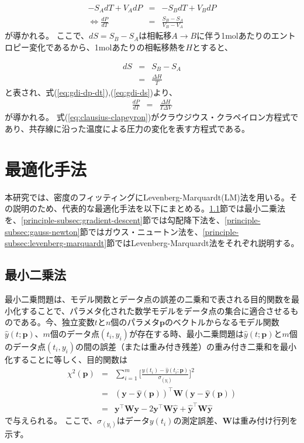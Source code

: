 \documentclass[titlepage]{jsreport}
\begin{document}
\large
\begin{eqnarray}
-S_AdT+V_AdP &=& -S_BdT+V_BdP \nonumber \\
\Leftrightarrow \frac{dP}{dT} &=& \frac{S_B-S_A}{V_B-V_A} \label{eq:gdi-dp-dt}
\end{eqnarray}
\normalsize
が導かれる。
ここで、$dS=S_B-S_A$は相転移$A\rightarrow{B}$に伴う1molあたりのエントロピー変化であるから、1molあたりの相転移熱を$H$とすると、

\large
\begin{eqnarray}
dS &=& S_B-S_A \nonumber \\
   &=& \frac{\Delta{H}}{T} \label{eq:gdi-ds}
\end{eqnarray}
\normalsize
と表され、式(\ref{eq:gdi-dp-dt}),(\ref{eq:gdi-ds})より、
\large
\begin{eqnarray}
\frac{dP}{dT} &=& \frac{\Delta{H}}{T\Delta{V}} \label{eq:clausius-clapeyron}
\end{eqnarray}
\normalsize
が導かれる。
式(\ref{eq:clausius-clapeyron})がクラウジウス・クラペイロン方程式であり、共存線に沿った温度による圧力の変化を表す方程式である\cite{atkins, clausius-clapeyron1}。


\section{最適化手法}\label{principle-sec:optimization-method}
本研究では、密度のフィッティングにLevenberg-Marquardt(LM)法を用いる。その説明のため、代表的な最適化手法を以下にまとめる。\ref{principle-subsec:least-squares}節では最小二乗法を、\ref{principle-subsec:gradient-descent}節では勾配降下法を、\ref{principle-subsec:gauss-newton}節ではガウス・ニュートン法を、\ref{principle-subsec:levenberg-marquardt}節ではLevenberg-Marquardt法をそれぞれ説明する。

\subsection{最小二乗法}\label{principle-subsec:least-squares}
最小二乗問題は、モデル関数とデータ点の誤差の二乗和で表される目的関数を最小化することで、パラメタ化された数学モデルをデータ点の集合に適合させるものである。今、独立変数$t$と$n$個のパラメタ$\bm{p}$のベクトルからなるモデル関数$\hat{y}(t;\bm{p})$、$m$個のデータ点$(t_i, y_i)$が存在する時、最小二乗問題は$\hat{y}(t;\bm{p})$と$m$個のデータ点$(t_i, y_i)$の間の誤差（または重み付き残差）の重み付き二乗和を最小化することに等しく、目的関数は
\large
\begin{eqnarray}
\chi^2(\bm{p}) &=& \sum_{i=1}^{m}\Bigg[\frac{y(t_i)-\hat{y}(t_i;\bm{p})}{\sigma_(y_i)}\Bigg]^2 \nonumber\\
               &=& (\bm{y}-\hat{\bm{y}}(\bm{p}))^\top\bm{W}(\bm{y}-\hat{\bm{y}}(\bm{p})) \nonumber\\
               &=& \bm{y}^\top\bm{W}\bm{y}-2\bm{y}^\top\bm{W}\hat{\bm{y}}+\hat{\bm{y}}^\top\bm{W}\hat{\bm{y}} \label{eq:queue-residual-error}
\end{eqnarray}
\normalsize
で与えられる。
ここで、$\sigma_(y_i)$はデータ$y(t_i)$の測定誤差、$\bm{W}$は重み付け行列を示す\cite{gradient-descent_gauss-newton_levenberg-marquardt}。
\end{document}
